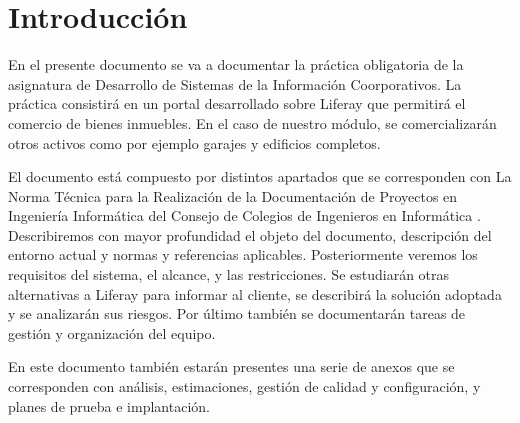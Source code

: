 \section{Introducción}

\par En el presente documento se va a documentar la práctica obligatoria de la asignatura de Desarrollo de Sistemas de la Información Coorporativos. La práctica consistirá en un portal desarrollado sobre Liferay que permitirá el comercio de bienes inmuebles. En el caso de nuestro módulo, se comercializarán otros activos como por ejemplo garajes y edificios completos.

\par El documento está compuesto por distintos apartados que se corresponden con La Norma Técnica para la Realización de la Documentación de Proyectos en Ingeniería Informática del Consejo de Colegios de Ingenieros en Informática \cite{IMPRO:CCII}. Describiremos con mayor profundidad el objeto del documento, descripción del entorno actual y normas y referencias aplicables. Posteriormente veremos los requisitos del sistema, el alcance, y las restricciones. Se estudiarán otras alternativas a Liferay para informar al cliente, se describirá la solución adoptada y se analizarán sus riesgos. Por último también se documentarán tareas de gestión y organización del equipo.

\par En este documento también estarán presentes una serie de anexos que se corresponden con análisis, estimaciones, gestión de calidad y configuración, y planes de prueba e implantación.
